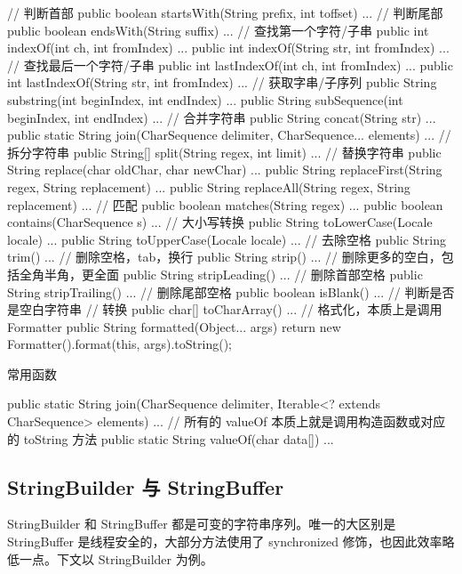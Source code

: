 \begin{Java}
// 判断首部
public boolean startsWith(String prefix, int toffset) { ... }
// 判断尾部
public boolean endsWith(String suffix) { ... }
// 查找第一个字符/子串
public int indexOf(int ch, int fromIndex) { ... }
public int indexOf(String str, int fromIndex) { ... }
// 查找最后一个字符/子串
public int lastIndexOf(int ch, int fromIndex) { ... }
public int lastIndexOf(String str, int fromIndex) { ... }
// 获取字串/子序列
public String substring(int beginIndex, int endIndex) { ... }
public String subSequence(int beginIndex, int endIndex) { ... }
// 合并字符串
public String concat(String str) { ... }
public static String join(CharSequence delimiter, CharSequence... elements) { ... }
// 拆分字符串
public String[] split(String regex, int limit) { ... }
// 替换字符串
public String replace(char oldChar, char newChar) { ... }
public String replaceFirst(String regex, String replacement) { ... }
public String replaceAll(String regex, String replacement) { ... }
// 匹配
public boolean matches(String regex) { ... }
public boolean contains(CharSequence s) { ... }
// 大小写转换
public String toLowerCase(Locale locale) { ... }
public String toUpperCase(Locale locale) { ... }
// 去除空格
public String trim() { ... }    // 删除空格，tab，换行
public String strip() { ... }   // 删除更多的空白，包括全角半角，更全面
public String stripLeading() { ... }    // 删除首部空格
public String stripTrailing() { ... }   // 删除尾部空格
public boolean isBlank() { ... }        // 判断是否是空白字符串
// 转换
public char[] toCharArray() {...}
// 格式化，本质上是调用 Formatter
public String formatted(Object... args) {
    return new Formatter().format(this, args).toString();
}
\end{Java}

常用函数

\begin{Java}
public static String join(CharSequence delimiter, Iterable<? extends CharSequence> elements) { ... }
// 所有的 valueOf 本质上就是调用构造函数或对应的 toString 方法
public static String valueOf(char data[]) { ... }
\end{Java}

\subsection{StringBuilder 与 StringBuffer}

StringBuilder 和 StringBuffer 都是可变的字符串序列。唯一的大区别是 StringBuffer 是线程安全的，大部分方法使用了 synchronized 修饰，也因此效率略低一点。下文以 StringBuilder 为例。

